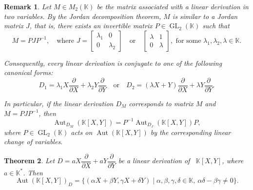\documentclass[11pt,a4paper,reqno]{amsart}
\newtheorem{theorem}{Theorem}[section]
\newtheorem{remark}[theorem]{Remark}}
\begin{document}
\begin{remark}
\label{obslinear}
Let $M \in M_2(\mathbb{K})$ be the matrix associated with a linear derivation in two variables. By the Jordan decomposition theorem, $M$ is similar to a Jordan matrix $J$, that is, there exists an invertible matrix $P \in \operatorname{GL}_2(\mathbb{K})$ such that
\[
M = PJP^{-1}, \quad \text{where } J = 
\begin{bmatrix}
\lambda_1 & 0 \\
0 & \lambda_2
\end{bmatrix}
\quad \text{or} \quad
\begin{bmatrix}
\lambda & 1 \\
0 & \lambda
\end{bmatrix}, \mbox{ for some } \lambda_1, \lambda_2, \lambda \in \mathbb{K}.
\]

Consequently, every linear derivation is conjugate to one of the following canonical forms:
\[
D_1 = \lambda_1 X \frac{\partial}{\partial X} + \lambda_2 Y \frac{\partial}{\partial Y} \quad \text{or} \quad D_2 = (\lambda X + Y)\frac{\partial}{\partial X} + \lambda Y \frac{\partial}{\partial Y}.
\]

In particular, if the linear derivation $D_M$ corresponds to matrix $M$ and $M=PJP^{-1}$, then
\[
\operatorname{Aut}_{D_M}(\mathbb{K}[X, Y]) = P^{-1} \operatorname{Aut}_{D_J}(\mathbb{K}[X, Y]) P,
\]
where $P \in \operatorname{GL}_2(\mathbb{K})$ acts on $\operatorname{Aut}(\mathbb{K}[X,Y])$ by the corresponding linear change of variables.
\end{remark}

	\begin{theorem} \label{th3.6}
Let $D = aX \dfrac{\partial}{\partial X} + aY \dfrac{\partial}{\partial Y}$ be a linear derivation of \, $\mathbb{K}[X,Y]$, where   $ a\in \mathbb{K}^{\ast}$. Then 
\[
\operatorname{Aut}(\mathbb{K}[X,Y])_D=\{ (\alpha X+\beta Y,\gamma X+\delta Y) \mid  \alpha, \beta,\gamma, \delta\in \mathbb{K},\ \alpha\delta-\beta\gamma\neq 0\}.
\]    
\end{theorem}
\end{document}
